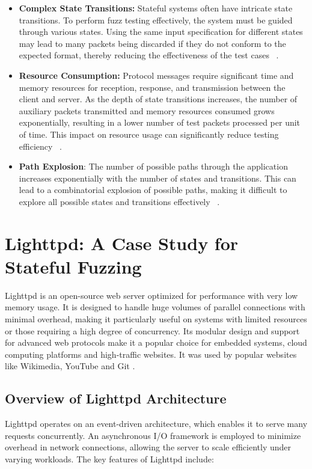 \begin{itemize} 
    \item \textbf{Complex State Transitions:} Stateful systems often have intricate state transitions. To perform fuzz testing effectively, the system must be guided through various states. Using the same input specification for different states may lead to many packets being discarded if they do not conform to the expected format, thereby reducing the effectiveness of the test cases ~\cite{tao2023gonet}.
    
    \item \textbf{Resource Consumption:} Protocol messages require significant time and memory resources for reception, response, and transmission between the client and server. As the depth of state transitions increases, the number of auxiliary packets transmitted and memory resources consumed grows exponentially, resulting in a lower number of test packets processed per unit of time. This impact on resource usage can significantly reduce testing efficiency ~\cite{tao2023gonet}.
    
    \item \textbf{Path Explosion}: The number of possible paths through the application increases exponentially with the number of states and transitions. This can lead to a combinatorial explosion of possible paths, making it difficult to explore all possible states and transitions effectively ~\cite{pathexplosion}.
\end{itemize}

\section{Lighttpd: A Case Study for Stateful Fuzzing}
Lighttpd is an open-source web server optimized for performance with very low memory usage. It is designed to handle huge volumes of parallel connections with minimal overhead, making it particularly useful on systems with limited resources or those requiring a high degree of concurrency. Its modular design and support for advanced web protocols make it a popular choice for embedded systems, cloud computing platforms and high-traffic websites. It was used by popular websites like Wikimedia, YouTube and Git \cite{lighttpdusage,lighttpdusage2}.

\subsection{Overview of Lighttpd Architecture}
Lighttpd operates on an event-driven architecture, which enables it to serve many requests concurrently. An asynchronous I/O framework is employed to minimize overhead in network connections, allowing the server to scale efficiently under varying workloads. The key features of Lighttpd include:

